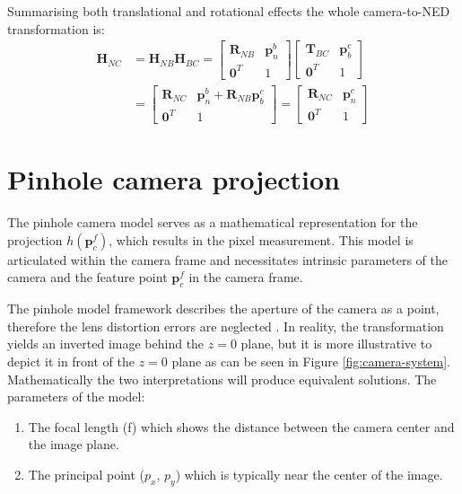 Summarising both translational and rotational effects the whole camera-to-NED transformation is:
\begin{equation}
\begin{aligned}
    \mathbf{H}_{NC}&=\mathbf{H}_{NB}\mathbf{H}_{BC} = 
    \begin{bmatrix}
        \mathbf{R}_{NB} & \mathbf{p}_{n}^b\\
        \mathbf{0}^T & 1
    \end{bmatrix} 
    \begin{bmatrix}
        \mathbf{T}_{BC} & \mathbf{p}_b^c\\
        \mathbf{0}^T & 1
    \end{bmatrix} \\ &=
    \begin{bmatrix}
        \mathbf{R}_{NC} & \mathbf{p}_n^b+\mathbf{R}_{NB}\mathbf{p}_b^c \\
        \mathbf{0}^T & 1
    \end{bmatrix} =
    \begin{bmatrix}
        \mathbf{R}_{NC} & \mathbf{p}_n^c \\
        \mathbf{0}^T & 1
    \end{bmatrix}
\end{aligned}
\label{eq:body2camera}
\end{equation}

\section{Pinhole camera projection}

The pinhole camera model serves as a mathematical representation for the projection $h(\mathbf{p}_c^f)$, which results in the pixel measurement. This model is articulated within the camera frame and necessitates intrinsic parameters of the camera and the feature point $\mathbf{p}_c^f$ in the camera frame. 

The pinhole model framework describes the aperture of the camera as a point, therefore the lens distortion errors are neglected \cite{pinhole_wikipedia, stanford_camera_models}. In reality, the transformation yields an inverted image behind the $z=0$ plane, but it is more illustrative to depict it in front of the $z=0$ plane as can be seen in Figure \ref{fig:camera-system}. Mathematically the two interpretations will produce equivalent solutions. The parameters of the model: 

\begin{enumerate}
    \item The focal length (f) which shows the distance between the camera center and the image plane.
    \item The principal point ($p_x$, $p_y$) which is typically near the center of the image.
\end{enumerate}

